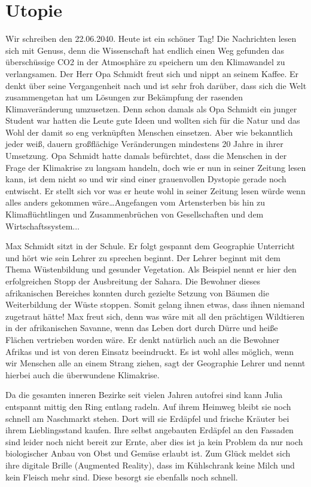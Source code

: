 \documentclass[twoside, a4paper, DIV=11, open=any, bibliography=totoc]{scrbook}
\begin{document}
\section{Utopie} \label{sec:szenutopie}

Wir schreiben den 22.06.2040.
Heute ist ein schöner Tag! 
Die Nachrichten lesen sich mit Genuss, denn die Wissenschaft hat endlich 
einen Weg gefunden das überschüssige CO2 in der Atmosphäre zu speichern 
um den Klimawandel zu verlangsamen. Der Herr Opa Schmidt freut sich 
und nippt an seinem Kaffee. Er denkt über seine Vergangenheit nach 
und ist sehr froh darüber, dass sich die Welt zusammengetan hat um 
Lösungen zur Bekämpfung der rasenden Klimaveränderung umzusetzen. 
Denn schon damals als Opa Schmidt ein junger Student war hatten die 
Leute gute Ideen und wollten sich für die Natur und das Wohl der damit 
so eng verknüpften Menschen einsetzen. Aber wie bekanntlich jeder weiß, 
dauern großflächige Veränderungen mindestens 20 Jahre in ihrer Umsetzung. 
Opa Schmidt hatte damals befürchtet, dass die Menschen in der Frage der Klimakrise 
zu langsam handeln, doch wie er nun in seiner Zeitung lesen kann, 
ist dem nicht so und wir sind einer grauenvollen Dystopie gerade noch entwischt. 
Er stellt sich vor was er heute wohl in seiner Zeitung lesen würde wenn alles 
anders gekommen wäre…Angefangen vom Artensterben bis hin zu Klimaflüchtlingen und 
Zusammenbrüchen von Gesellschaften und dem Wirtschaftssystem...


Max Schmidt sitzt in der Schule. Er folgt gespannt dem Geographie Unterricht 
und hört wie sein Lehrer zu sprechen beginnt. Der Lehrer beginnt mit dem Thema 
Wüstenbildung und gesunder Vegetation. Als Beispiel nennt er hier den erfolgreichen 
Stopp der Ausbreitung der Sahara. Die Bewohner dieses afrikanischen Bereiches 
konnten durch gezielte Setzung von Bäumen die Weiterbildung der Wüste stoppen. 
Somit gelang ihnen etwas, dass ihnen niemand zugetraut hätte! Max freut sich, 
denn was wäre mit all den prächtigen Wildtieren in der afrikanischen Savanne, 
wenn das Leben dort durch Dürre und heiße Flächen vertrieben worden wäre. 
Er denkt natürlich auch an die Bewohner Afrikas und ist von deren 
Einsatz beeindruckt. Es ist wohl alles möglich, wenn wir Menschen 
alle an einem Strang ziehen, sagt der Geographie Lehrer und nennt hierbei 
auch die überwundene Klimakrise.


Da die gesamten inneren Bezirke seit vielen Jahren autofrei sind kann Julia entspannt 
mittig den Ring entlang radeln. Auf ihrem Heimweg bleibt sie noch schnell am Naschmarkt 
stehen. Dort will sie Erdäpfel und frische Kräuter bei ihrem Lieblingsstand kaufen. 
Ihre selbst angebauten Erdäpfel an den Fassaden sind leider noch nicht bereit zur Ernte, 
aber dies ist ja kein Problem da nur noch biologischer Anbau 
von Obst und Gemüse erlaubt ist. Zum Glück meldet sich ihre digitale Brille 
(Augmented Reality), dass im Kühlschrank keine Milch und kein Fleisch mehr sind. 
Diese besorgt sie ebenfalls noch schnell.
\end{document}
